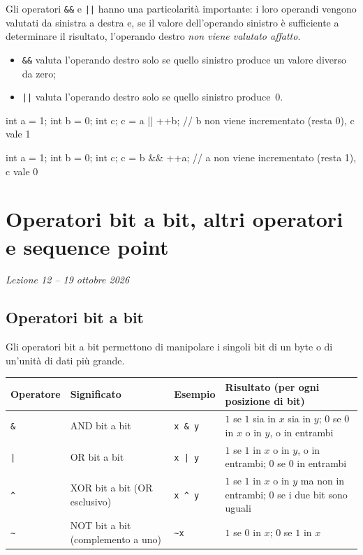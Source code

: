 \documentclass[11pt,a4paper]{article}
\begin{document}
Gli operatori \lstinline|&&| e \lstinline/||/ hanno una particolarità importante: i loro operandi vengono valutati da sinistra a destra e, se il valore dell'operando sinistro è sufficiente a determinare il risultato, l'operando destro \emph{non viene valutato affatto}.
\begin{itemize}
    \item \lstinline|&&| valuta l'operando destro solo se quello sinistro produce un valore diverso da zero;
    \item \lstinline/||/ valuta l'operando destro solo se quello sinistro produce~$0$.
\end{itemize}

\begin{esempio}
\begin{codice}
int a = 1;
int b = 0;
int c;
c = a || ++b;    // b non viene incrementato (resta 0), c vale 1
\end{codice}
\begin{codice}
int a = 1;
int b = 0;
int c;
c = b && ++a;    // a non viene incrementato (resta 1), c vale 0
\end{codice}
\end{esempio}

\section[Operatori bit a bit, altri operatori e sequence point (Lezione 12 -- 19 ottobre 2026)]{Operatori bit a bit, altri operatori e sequence point}
\noindent\emph{Lezione 12 -- 19 ottobre 2026}
\subsection{Operatori bit a bit}

Gli operatori bit a bit permettono di manipolare i singoli bit di un byte o di un'unità di dati più grande.

\begin{center}
\begin{tabular}{l p{3.2cm} l p{5.6cm}}
\toprule
Operatore & Significato & Esempio & Risultato (per ogni posizione di bit)\\
\midrule
\lstinline|&| & AND bit a bit & \lstinline|x & y| & $1$ se $1$ sia in $x$ sia in $y$; $0$ se $0$ in $x$ o in $y$, o in entrambi\\
\lstinline/|/ & OR bit a bit & \lstinline/x | y/ & $1$ se $1$ in $x$ o in $y$, o in entrambi; $0$ se $0$ in entrambi\\
\lstinline|^| & XOR bit a bit (OR esclusivo) & \lstinline|x ^ y| & $1$ se $1$ in $x$ o in $y$ ma non in entrambi; $0$ se i due bit sono uguali\\
\lstinline|~| & NOT bit a bit (complemento a uno) & \lstinline|~x| & $1$ se $0$ in $x$; $0$ se $1$ in $x$\\
\bottomrule
\end{tabular}
\end{center}
\end{document}
